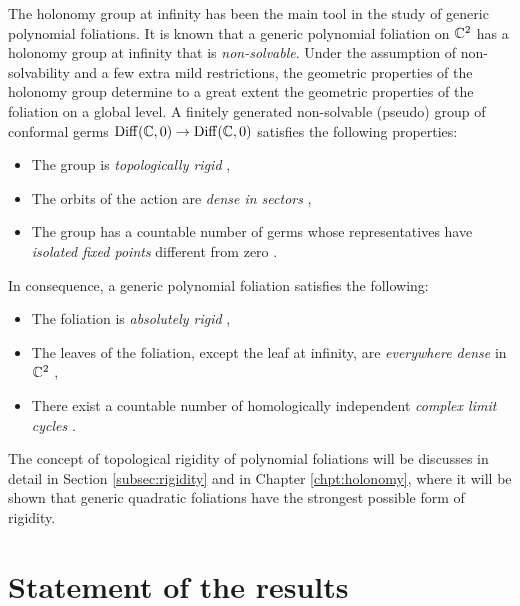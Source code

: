 \documentclass[phd,tocprelim]{cornell}
\begin{document}
The holonomy group at infinity has been the main tool in the study of generic polynomial foliations. It is known that a generic polynomial foliation on $\mathbb{C}^2$ has a holonomy group at infinity that is \textit{non-solvable}. Under the assumption of non-solvability and a few extra mild restrictions, the geometric properties of the holonomy group determine to a great extent the geometric properties of the foliation on a global level. A finitely generated non-solvable (pseudo) group of conformal germs $\operatorname{Diff}(\mathbb{C},0)\to\operatorname{Diff}(\mathbb{C},0)$ satisfies the following properties:
%
\begin{itemize}[topsep=-2pt,itemsep=-4pt]
 \item The group is \textit{topologically rigid} \cite{Shcherbakov1984, Nakai1994},
 \item The orbits of the action are \textit{dense in sectors} \cite{Nakai1994},
 \item The group has a countable number of germs whose representatives have \textit{isolated fixed points} different from zero \cite{BelliartLiousseLoray1997, ShcherbakovRosalesOrtiz1998}.
\end{itemize}
%
In consequence, a generic polynomial foliation satisfies the following:
%
\begin{itemize}[topsep=-2pt,itemsep=-4pt]
 \item The foliation is \textit{absolutely rigid}  \cite{Ilyashenko1978, Shcherbakov1984, LinsNetoSadScardua1998},
 \item The leaves of the foliation, except the leaf at infinity, are \textit{everywhere dense} in $\mathbb{C}^2$ \cite{HudaiVerenov1962,Shcherbakov1984},
 \item There exist a countable number of homologically independent \textit{complex limit cycles} \cite{ShcherbakovRosalesOrtiz1998,GoncharukKudryashov2017}. %
\end{itemize}

The concept of topological rigidity of polynomial foliations will be discusses in detail in Section \ref{subsec:rigidity} and in Chapter \ref{chpt:holonomy}, where it will be shown that generic quadratic foliations have the strongest possible form of rigidity.




\section{Statement of the results}
\end{document}
